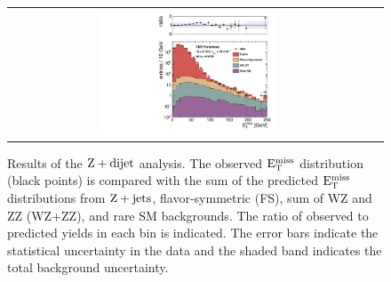 \begin{figure}[!h]
\begin{center}
\begin{tabular}{cc}
\includegraphics[width=0.5\textwidth]{plots/pfmet_bveto_all_19fb.pdf}
\end{tabular}
\caption{Results of the $\rm{Z}+{dijet}$ analysis. The observed $\rm{E_{T}^{miss}}$ distribution (black points) is compared with the sum of the predicted $\rm{E_{T}^{miss}}$
distributions from $\rm{Z}+\rm{jets}$, flavor-symmetric (FS), sum of WZ and ZZ (WZ+ZZ), and rare SM backgrounds. The ratio of observed to predicted yields in each bin is
indicated. The error bars indicate the statistical uncertainty in the data and the shaded band indicates the total background uncertainty.
\label{fig:results_targ}
}
\end{center}
\end{figure}



